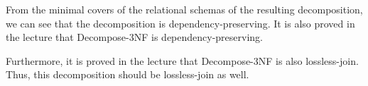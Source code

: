 \documentclass[12pt]{article}
\begin{document}
\begin{enumerate}
        From the minimal covers of the relational schemas of the resulting
        decomposition, we can see that the decomposition is
        dependency-preserving. It is also proved in the lecture that
        Decompose-3NF is dependency-preserving.

        Furthermore, it is proved in the lecture that Decompose-3NF is also
        lossless-join. Thus, this decomposition should be lossless-join as well.

        


\end{enumerate}
\end{document}
